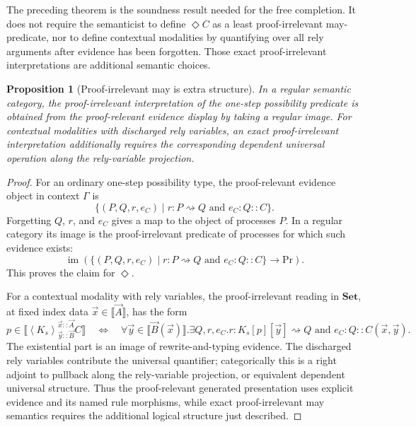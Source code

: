 \documentclass[11pt]{article}
\newcommand{\Proc}{\mathrm{Pr}}
\newcommand{\rw}{\rightsquigarrow}
\newcommand{\ty}{\mathrel{::}}
\newcommand{\Dia}{\Diamond}
\newcommand{\Mod}[4]{\left\langle #1\right\rangle^{#2}_{#3} #4}
\newtheorem{proposition}[definition]{Proposition}
\begin{document}
The preceding theorem is the soundness result needed for the free completion.
It does not require the semanticist to define \(\Dia C\) as a least
proof-irrelevant may-predicate, nor to define contextual modalities by
quantifying over all rely arguments after evidence has been forgotten.  Those
exact proof-irrelevant interpretations are additional semantic choices.

\begin{proposition}[Proof-irrelevant may is extra structure]
\label{prop:regular-may-full}
In a regular semantic category, the proof-irrelevant interpretation of the
one-step possibility predicate is obtained from the proof-relevant evidence
display by taking a regular image.  For contextual modalities with discharged
rely variables, an exact proof-irrelevant interpretation additionally requires
the corresponding dependent universal operation along the rely-variable
projection.
\end{proposition}

\begin{proof}
For an ordinary one-step possibility type, the proof-relevant evidence object in
context \(\Gamma\) is
\[
  \{(P,Q,r,e_C)\mid r:P\rw Q\text{ and }e_C:Q\ty C\}.
\]
Forgetting \(Q\), \(r\), and \(e_C\) gives a map to the object of processes
\(P\).  In a regular category its image is the proof-irrelevant predicate of
processes for which such evidence exists:
\[
  \operatorname{im}\left(
    \{(P,Q,r,e_C)\mid r:P\rw Q\text{ and }e_C:Q\ty C\}
    \longrightarrow
    \Proc
  \right).
\]
This proves the claim for \(\Dia\).

For a contextual modality with rely variables, the proof-irrelevant reading in
\(\mathbf{Set}\), at fixed index data \(\vec x\in\llbracket\vec A\rrbracket\),
has the form
\[
  p\in
  \llbracket\Mod{K_s}{\vec x\ty\vec A}{\vec y\ty\vec B}{C}\rrbracket
  \quad\Longleftrightarrow\quad
  \forall \vec y\in\llbracket\vec B(\vec x)\rrbracket.
  \exists Q,r,e_C.
  r:K_s[p][\vec y]\rw Q
  \text{ and }
  e_C:Q\ty C(\vec x,\vec y).
\]
The existential part is an image of rewrite-and-typing evidence.  The discharged
rely variables contribute the universal quantifier; categorically this is a
right adjoint to pullback along the rely-variable projection, or equivalent
dependent universal structure.  Thus the proof-relevant generated presentation
uses explicit evidence and its named rule morphisms, while exact
proof-irrelevant may semantics requires the additional logical structure just
described.
\end{proof}
\end{document}
